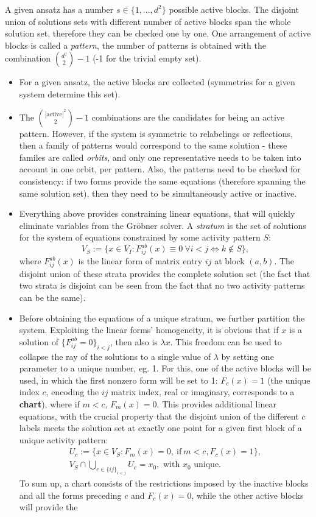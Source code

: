 \documentclass[a4paper, 11pt, twoside, onecolumn]{article}
\begin{document}
A given ansatz has a number $s\in \{1,...,d^2\}$ possible active blocks. The disjoint union of solutions sets with different number of active blocks span the whole solution set, therefore they can be checked one by one. One arrangement of active blocks is called a \textit{pattern}, the number of patterns is obtained with the combination $\binom{d^2}{2}-1$ (-1 for the trivial empty set).
\begin{itemize}
    \item For a given ansatz, the active blocks are collected (symmetries for a given system determine this set). 
    \item The $\binom{\mathrm{|active|}^2}{2}-1$ combinations are the candidates for being an active pattern. However, if the system is symmetric to relabelings or reflections, then a family of patterns would correspond to the same solution - these familes are called \textit{orbits}, and only one representative needs to be taken into account in one orbit, per pattern. Also, the patterns need to be checked for consistency: if two forms provide the same equations (therefore spanning the same solution set), then they need to be simultaneously active or inactive.
    \item Everything above provides constraining linear equations, that will quickly eliminate variables from the Gröbner solver. A \textit{stratum} is the set of solutions for the system of equations constrained by some activity pattern $S$:
    \begin{equation}
        V_S:=\{x\in V_I:F^{ab}_{ij}(x)\equiv 0\ \forall i<j \Leftrightarrow k\not\in S \},
    \end{equation}
    where $F^{ab}_{ij}(x)$ is the linear form of matrix entry $ij$ at block $(a,b)$. The disjoint union of these strata provides the complete solution set (the fact that two strata is disjoint can be seen from the fact that no two activity patterns can be the same).
    \item Before obtaining the equations of a unique stratum, we further partition the system. Exploiting the linear forms' homogeneity, it is obvious that if $x$ is a solution of $\{F_{ij}^{ab}=0\}_{i<j}$, then also is $\lambda x$. This freedom can be used to collapse the ray of the solutions to a single value of $\lambda$ by setting one parameter to a unique number, eg. 1. For this, one of the active blocks will be used, in which the first nonzero form will be set to 1: $F_c(x)=1$ (the unique index $c$, encoding the $ij$ matrix index, real or imaginary, corresponds to a \textbf{chart}), where if $m<c$, $F_m(x)=0$. This provides additional linear equations, with the crucial property that the disjoint union of the different $c$ labels meets the solution set at exactly one point for a given first block of a unique activity pattern:
    \begin{gather}
        U_c:=\{x\in V_S:F_m(x)=0,\ \text{if}\ m<c, F_c(x)=1\}, \\
        V_S\cap \bigcup_{c\in\{ij\}_{i<j}}U_c=x_0, \text{ with } x_0 \text{ unique.}
    \end{gather}
    To sum up, a chart consists of the restrictions imposed by the inactive blocks and all the forms preceding $c$ and $F_c(x)=0$, while the other active blocks will provide the 
\end{itemize}
\end{document}
